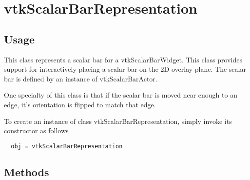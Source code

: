 \section{vtkScalarBarRepresentation}

\subsection{Usage}


 This class represents a scalar bar for a vtkScalarBarWidget.  This class
 provides support for interactively placing a scalar bar on the 2D overlay
 plane.  The scalar bar is defined by an instance of vtkScalarBarActor.

 One specialty of this class is that if the scalar bar is moved near enough
 to an edge, it's orientation is flipped to match that edge.


To create an instance of class vtkScalarBarRepresentation, simply
invoke its constructor as follows
\begin{verbatim}
  obj = vtkScalarBarRepresentation
\end{verbatim}
\subsection{Methods}


